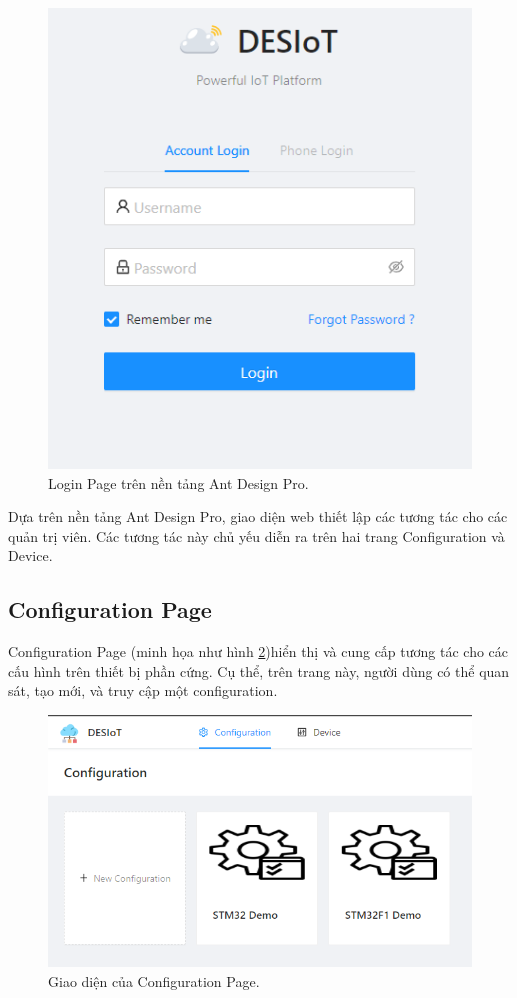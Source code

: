 \begin{figure}[htp]
\centering
\includegraphics[width=0.7\linewidth]{images/fig-adp-default-loginpage.png}
\caption{Login Page trên nền tảng Ant Design Pro.}
\label{fig:adp-default-loginpage}
\end{figure}

Dựa trên nền tảng Ant Design Pro, giao diện web thiết lập các tương tác cho các quản trị viên. Các tương tác này chủ yếu diễn ra trên hai trang Configuration và Device.

\subsection{Configuration Page}

Configuration Page (minh họa như hình \ref{fig:config-page})hiển thị và cung cấp tương tác cho các cấu hình trên thiết bị phần cứng. Cụ thể, trên trang này, người dùng có thể quan sát, tạo mới, và truy cập một configuration.

\begin{figure}[htp]
\centering
\includegraphics[width=0.7\linewidth]{images/fig-config-page.png}
\caption{Giao diện của Configuration Page.}
\label{fig:config-page}
\end{figure}

